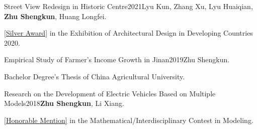\documentclass{joel_cv}
\begin{document}
\begin{enumerate}[label={[\arabic*]}]
	\item \begin{sectionContentNormal}{Street View Redesign in Historic Centre}{2021}{Lyu Kun, Zhang Xu, Lyu Huaiqian, \textbf{Zhu Shengkun}, Huang Longfei.} 
		
		\item \href{https://zhu-sk.github.io/SilverAward.pdf}{[Silver Award]} in the Exhibition of Architectural Design in Developing Countries 2020.
	\end{sectionContentNormal}
	
			\item \begin{sectionContentNormal}{Empirical Study of Farmer's Income Growth in Jinan}{2019}{Zhu Shengkun.}
		\item Bachelor Degree's Thesis of China Agricultural University.
	\end{sectionContentNormal}
	
		\item \begin{sectionContentNormal}{Research on the Development of Electric Vehicles Based on Multiple Models}{2018}{\textbf{Zhu Shengkun}, Li Xiang.}
		\item \href{https://zhu-sk.github.io/MCM_ICM.pdf}{[Honorable Mention]} in the Mathematical/Interdisciplinary Contest in Modeling.
	\end{sectionContentNormal}
	
	

\end{enumerate}
\end{document}
